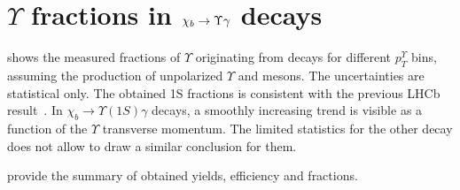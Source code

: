 \section{\texorpdfstring{$\Upsilon$}{Y} fractions in \texorpdfstring{$\chi_{b} \rightarrow \Upsilon \gamma$}{chib --> Y gamma} decays}
\label{sec:fraction}

 shows the measured fractions of $\Upsilon$  originating
from \chib decays for different $p_T^{\Upsilon}$ bins,  assuming the production
of unpolarized $\Upsilon$ and \chib mesons. The uncertainties are statistical
only. The obtained \Y1S fractions is consistent with the previous LHCb
result~\cite{LHCb-PAPER-2012-015}. In $\chi_b \rightarrow \Upsilon(1S) \gamma$
decays, a smoothly increasing trend is visible as a function of the $\Upsilon$
transverse momentum. The limited statistics for the other decay does not allow
to draw a similar conclusion for them.




 provide the summary
of obtained yields, efficiency and fractions.


